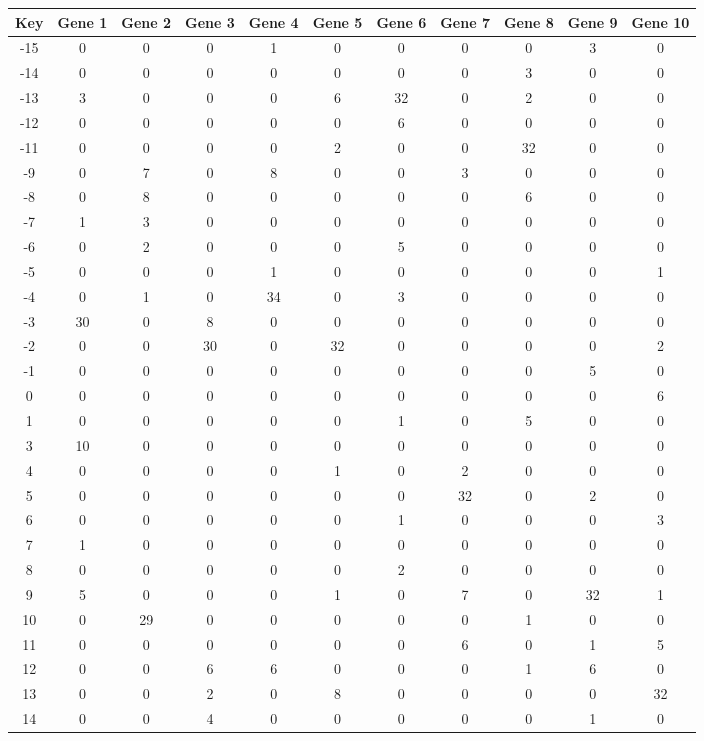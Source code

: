 \begin{tabular}{|c|c|c|c|c|c|c|c|c|c|c|}
\hline
Key & Gene 1 & Gene 2 & Gene 3 & Gene 4 & Gene 5 & Gene 6 & Gene 7 & Gene 8 & Gene 9 & Gene 10 \\
\hline
-15 & 0 & 0 & 0 & 1 & 0 & 0 & 0 & 0 & 3 & 0 \\
-14 & 0 & 0 & 0 & 0 & 0 & 0 & 0 & 3 & 0 & 0 \\
-13 & 3 & 0 & 0 & 0 & 6 & 32 & 0 & 2 & 0 & 0 \\
-12 & 0 & 0 & 0 & 0 & 0 & 6 & 0 & 0 & 0 & 0 \\
-11 & 0 & 0 & 0 & 0 & 2 & 0 & 0 & 32 & 0 & 0 \\
-9 & 0 & 7 & 0 & 8 & 0 & 0 & 3 & 0 & 0 & 0 \\
-8 & 0 & 8 & 0 & 0 & 0 & 0 & 0 & 6 & 0 & 0 \\
-7 & 1 & 3 & 0 & 0 & 0 & 0 & 0 & 0 & 0 & 0 \\
-6 & 0 & 2 & 0 & 0 & 0 & 5 & 0 & 0 & 0 & 0 \\
-5 & 0 & 0 & 0 & 1 & 0 & 0 & 0 & 0 & 0 & 1 \\
-4 & 0 & 1 & 0 & 34 & 0 & 3 & 0 & 0 & 0 & 0 \\
-3 & 30 & 0 & 8 & 0 & 0 & 0 & 0 & 0 & 0 & 0 \\
-2 & 0 & 0 & 30 & 0 & 32 & 0 & 0 & 0 & 0 & 2 \\
-1 & 0 & 0 & 0 & 0 & 0 & 0 & 0 & 0 & 5 & 0 \\
0 & 0 & 0 & 0 & 0 & 0 & 0 & 0 & 0 & 0 & 6 \\
1 & 0 & 0 & 0 & 0 & 0 & 1 & 0 & 5 & 0 & 0 \\
3 & 10 & 0 & 0 & 0 & 0 & 0 & 0 & 0 & 0 & 0 \\
4 & 0 & 0 & 0 & 0 & 1 & 0 & 2 & 0 & 0 & 0 \\
5 & 0 & 0 & 0 & 0 & 0 & 0 & 32 & 0 & 2 & 0 \\
6 & 0 & 0 & 0 & 0 & 0 & 1 & 0 & 0 & 0 & 3 \\
7 & 1 & 0 & 0 & 0 & 0 & 0 & 0 & 0 & 0 & 0 \\
8 & 0 & 0 & 0 & 0 & 0 & 2 & 0 & 0 & 0 & 0 \\
9 & 5 & 0 & 0 & 0 & 1 & 0 & 7 & 0 & 32 & 1 \\
10 & 0 & 29 & 0 & 0 & 0 & 0 & 0 & 1 & 0 & 0 \\
11 & 0 & 0 & 0 & 0 & 0 & 0 & 6 & 0 & 1 & 5 \\
12 & 0 & 0 & 6 & 6 & 0 & 0 & 0 & 1 & 6 & 0 \\
13 & 0 & 0 & 2 & 0 & 8 & 0 & 0 & 0 & 0 & 32 \\
14 & 0 & 0 & 4 & 0 & 0 & 0 & 0 & 0 & 1 & 0 \\
\hline
\end{tabular}